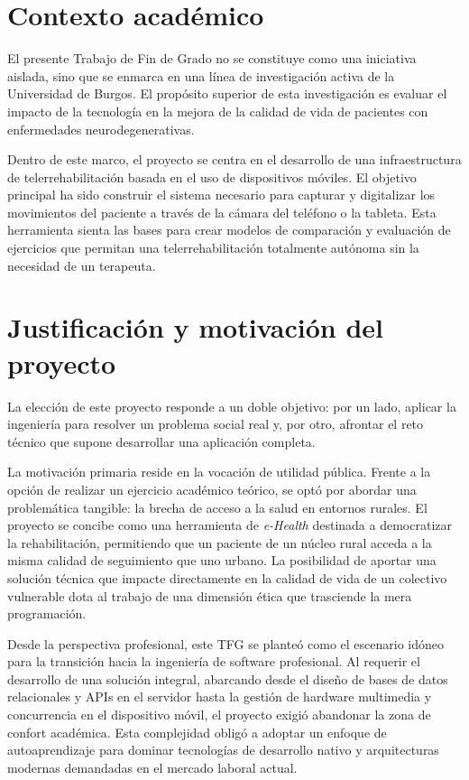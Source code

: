 \section{Contexto académico}

El presente Trabajo de Fin de Grado no se constituye como una iniciativa aislada, sino que se enmarca en una línea de investigación activa de la Universidad de Burgos. El propósito superior de esta investigación es evaluar el impacto de la tecnología en la mejora de la calidad de vida de pacientes con enfermedades neurodegenerativas.

Dentro de este marco, el proyecto se centra en el desarrollo de una infraestructura de telerrehabilitación basada en el uso de dispositivos móviles. El objetivo principal ha sido construir el sistema necesario para capturar y digitalizar los movimientos del paciente a través de la cámara del teléfono o la tableta. Esta herramienta sienta las bases para crear modelos de comparación y evaluación de ejercicios que permitan una telerrehabilitación totalmente autónoma sin la necesidad de un terapeuta.

\section{Justificación y motivación del proyecto}

La elección de este proyecto responde a un doble objetivo: por un lado, aplicar la ingeniería para resolver un problema social real y, por otro, afrontar el reto técnico que supone desarrollar una aplicación completa.

La motivación primaria reside en la vocación de utilidad pública. Frente a la opción de realizar un ejercicio académico teórico, se optó por abordar una problemática tangible: la brecha de acceso a la salud en entornos rurales. El proyecto se concibe como una herramienta de \textit{e-Health} destinada a democratizar la rehabilitación, permitiendo que un paciente de un núcleo rural acceda a la misma calidad de seguimiento que uno urbano. La posibilidad de aportar una solución técnica que impacte directamente en la calidad de vida de un colectivo vulnerable dota al trabajo de una dimensión ética que trasciende la mera programación.

Desde la perspectiva profesional, este TFG se planteó como el escenario idóneo para la transición hacia la ingeniería de software profesional. Al requerir el desarrollo de una solución integral, abarcando desde el diseño de bases de datos relacionales y APIs en el servidor hasta la gestión de hardware multimedia y concurrencia en el dispositivo móvil, el proyecto exigió abandonar la zona de confort académica. Esta complejidad obligó a adoptar un enfoque de autoaprendizaje para dominar tecnologías de desarrollo nativo y arquitecturas modernas demandadas en el mercado laboral actual.

